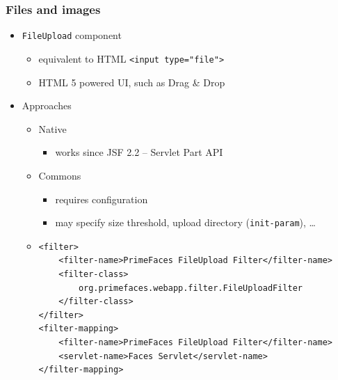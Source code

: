 \documentclass[10pt,xcolor=pdflatex]{beamer}
\begin{document}
\begin{frame}[containsverbatim]\frametitle{Files and images}
  \begin{itemize}
    \item \texttt{FileUpload} component
	  \begin{itemize}
		\item equivalent to HTML \verb;<input type="file">;
		\item HTML 5 powered UI, such as Drag \& Drop
	  \end{itemize}
    \item Approaches
      \begin{itemize}
    	\item Native
          \begin{itemize}
            \item works since JSF 2.2 -- Servlet Part API
          \end{itemize}
    	\item Commons
          \begin{itemize}
            \item requires configuration
            \item may specify size threshold, upload directory (\texttt{init-param}), \ldots
          \end{itemize}
    	\item[] \begin{footnotesize} \begin{verbatim}
<filter>
    <filter-name>PrimeFaces FileUpload Filter</filter-name>
    <filter-class>
        org.primefaces.webapp.filter.FileUploadFilter
    </filter-class>
</filter>
<filter-mapping>
    <filter-name>PrimeFaces FileUpload Filter</filter-name>
    <servlet-name>Faces Servlet</servlet-name>
</filter-mapping>    	
    	\end{verbatim} \end{footnotesize}
      \end{itemize}
  \end{itemize}
\end{frame}
\end{document}
